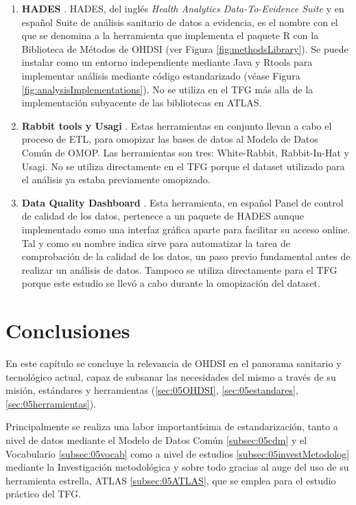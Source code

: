 \begin{enumerate}[label=\alph*.]
    
    \item \textbf{HADES} \cite{githubHADES}. HADES, del inglés\textit{ Health Analytics Data-To-Evidence Suite} y en español Suite de análisis sanitario de datos a evidencia, es el nombre con el que se denomina a la herramienta que implementa el paquete R con la Biblioteca de Métodos de OHDSI (ver Figura \ref{fig:methodsLibrary}). Se puede instalar como un entorno independiente mediante Java y Rtools para implementar análisis mediante código estandarizado (véase Figura \ref{fig:analysisImplementations}). No se utiliza en el TFG más alla de la implementación subyacente de las bibliotecas en ATLAS.
    \item \textbf{Rabbit tools y Usagi} \cite{OHDSIsoftTools}. Estas herramientas en conjunto llevan a cabo el proceso de ETL, para omopizar las bases de datos al Modelo de Datos Común de OMOP. Las herramientas son tres: White-Rabbit, Rabbit-In-Hat y Usagi. No se utiliza directamente en el TFG porque el dataset utilizado para el análisis ya estaba previamente omopizado.
    \item \textbf{Data Quality Dashboard} \cite{githubDQD}. Esta herramienta, en español Panel de control de calidad de los datos, pertenece a un paquete de HADES aunque implementado como una interfaz gráfica aparte para facilitar su acceso online. Tal y como su nombre indica sirve para automatizar la tarea de comprobación de la calidad de los datos, un paso previo fundamental antes de realizar un análisis de datos. Tampoco se utiliza directamente para el TFG porque este estudio se llevó a cabo durante la omopización del dataset.
        
\end{enumerate}

\section{Conclusiones} \label{sec:05conclusion}

En este capítulo se concluye la relevancia de OHDSI en el panorama sanitario y tecnológico actual, capaz de subsanar las necesidades del mismo a través de su misión, estándares y herramientas (\ref{sec:05OHDSI}, \ref{sec:05estandares}, \ref{sec:05herramientas}).

Principalmente se realiza una labor importantísima de estandarización, tanto a nivel de datos mediante el Modelo de Datos Común \ref{subsec:05cdm} y el Vocabulario \ref{subsec:05vocab} como a nivel de estudios \ref{subsec:05investMetodolog} mediante la Investigación metodológica y sobre todo gracias al auge del uso de su herramienta estrella, ATLAS \ref{subsec:05ATLAS}, que se emplea para el estudio práctico del TFG.